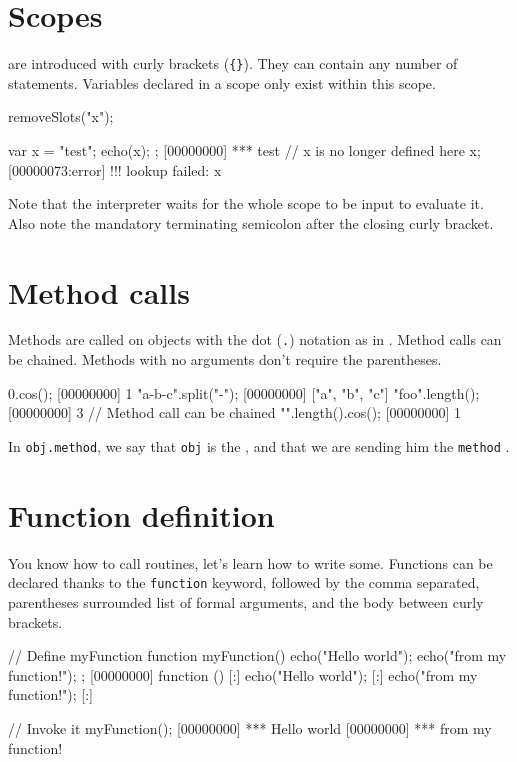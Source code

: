 \section{Scopes}
 are introduced with curly brackets (\lstinline|{}|).  They can
contain any number of statements. Variables declared in a scope only exist
within this scope.

\begin{urbicomment}
removeSlots("x");
\end{urbicomment}
\begin{urbiscript}
{
  var x = "test";
  echo(x);
};
[00000000] *** test
// x is no longer defined here
x;
[00000073:error] !!! lookup failed: x
\end{urbiscript}

Note that the interpreter waits for the whole scope to be input to evaluate
it. Also note the mandatory terminating semicolon after the closing curly
bracket.

\section{Method calls}

Methods are called on objects with the dot (\lstinline{.}) notation as in
\Cxx.  Method calls can be chained.  Methods with no arguments don't require
the parentheses.

\begin{urbiscript}
0.cos();
[00000000] 1
"a-b-c".split("-");
[00000000] ["a", "b", "c"]
"foo".length();
[00000000] 3
// Method call can be chained
"".length().cos();
[00000000] 1
\end{urbiscript}

In \lstinline|obj.method|, we say that \lstinline{obj} is the
, and that we are sending him the \lstinline{method}
.

\section{Function definition}

You know how to call routines, let's learn how to write
some. Functions can be declared thanks to the \lstinline{function}
keyword, followed by the comma separated, parentheses surrounded list
of formal arguments, and the body between curly brackets.

\begin{urbiscript}
// Define myFunction
function myFunction()
{
  echo("Hello world");
  echo("from my function!");
};
[00000000] function () {
[:]  echo("Hello world");
[:]  echo("from my function!");
[:]}

// Invoke it
myFunction();
[00000000] *** Hello world
[00000000] *** from my function!
\end{urbiscript}

